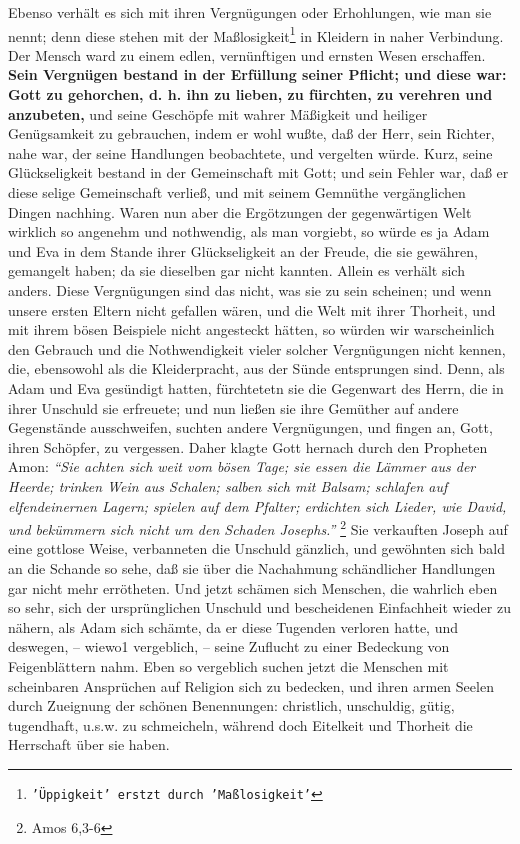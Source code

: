 Ebenso verhält es sich mit ihren Vergnügungen oder Erhohlungen, wie man sie
nennt; denn diese stehen mit der Maßlosigkeit\footnote{\texttt{'Üppigkeit' erstzt durch 'Maßlosigkeit'}} in Kleidern in naher Verbindung. Der
Mensch ward zu einem edlen, vernünftigen und ernsten Wesen erschaffen. \textbf{Sein
Vergnügen bestand in der Erfüllung seiner Pflicht; und diese war: Gott zu
gehorchen, d. h. ihn zu lieben, zu fürchten, zu verehren und anzubeten,} und
seine Geschöpfe mit wahrer Mäßigkeit und heiliger Genügsamkeit zu gebrauchen,
indem er wohl wußte, daß der Herr, sein Richter, nahe war, der seine Handlungen
beobachtete, und vergelten würde. Kurz, seine Glückseligkeit bestand in der
Gemeinschaft mit Gott; und sein Fehler war, daß er diese selige Gemeinschaft
verließ, und mit seinem Gemnüthe vergänglichen Dingen nachhing. Waren nun aber
die Ergötzungen der gegenwärtigen Welt wirklich so angenehm und nothwendig, als
man vorgiebt, so würde es ja Adam und Eva in dem Stande ihrer Glückseligkeit an
der Freude, die sie gewähren, gemangelt haben; da sie dieselben gar nicht
kannten. Allein es verhält sich anders. Diese Vergnügungen sind das nicht, was
sie zu sein scheinen; und wenn unsere ersten Eltern nicht gefallen wären, und
die Welt mit ihrer Thorheit, und mit ihrem bösen Beispiele nicht angesteckt
hätten, so würden wir warscheinlich den Gebrauch und die Nothwendigkeit vieler
solcher Vergnügungen nicht kennen, die, ebensowohl als die Kleiderpracht, aus
der Sünde entsprungen sind. Denn, als Adam und Eva gesündigt hatten, fürchtetetn
sie die Gegenwart des Herrn, die in ihrer Unschuld sie erfreuete; und nun ließen
sie ihre Gemüther auf andere Gegenstände ausschweifen, suchten andere
Vergnügungen, und fingen an, Gott, ihren Schöpfer, zu vergessen. Daher klagte
Gott hernach durch den Propheten Amon:
\textit{"`Sie achten sich weit vom bösen Tage;
sie essen die Lämmer aus der Heerde; trinken Wein aus Schalen; salben sich mit
Balsam; schlafen auf elfendeinernen Lagern; spielen auf dem Pfalter; erdichten
sich Lieder, wie David, und bekümmern sich nicht um den Schaden
Josephs."'}
\footnote{Amos 6,3-6}
Sie verkauften Joseph auf eine gottlose
Weise, verbanneten die Unschuld gänzlich, und gewöhnten sich bald an die Schande
so sehe, daß sie über die Nachahmung schändlicher Handlungen gar nicht mehr
errötheten. Und jetzt schämen sich Menschen, die wahrlich eben so sehr, sich der
ursprünglichen Unschuld und bescheidenen Einfachheit wieder zu nähern, als Adam
sich schämte, da er diese Tugenden verloren hatte, und deswegen, -- wiewo1
vergeblich, -- seine Zuflucht zu einer Bedeckung von Feigenblättern nahm. Eben
so vergeblich suchen jetzt die Menschen mit scheinbaren Ansprüchen auf Religion
sich zu bedecken, und ihren armen Seelen durch Zueignung der schönen
Benennungen: christlich, unschuldig, gütig, tugendhaft, u.s.w. zu schmeicheln,
während doch Eitelkeit und Thorheit die Herrschaft über sie haben.

